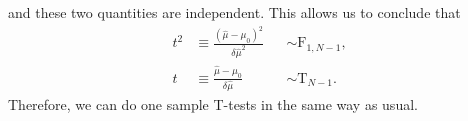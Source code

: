 \documentclass[12pt]{article}
\newcommand{\mh}{\hat\mu}
\begin{document}
%
and these two quantities are independent. This allows us to conclude that
%
\begin{equation}\label{eq:Tstats}
  \begin{aligned}
    t^2 &\equiv \frac{(\mh - \mu_0)^2}{\delta\mh^2} &&\sim \text{F}_{1,N-1}, \\
    t   &\equiv \frac{\mh - \mu_0}{\delta\mh}       &&\sim \text{T}_{N-1}.
  \end{aligned}
\end{equation}
%
Therefore, we can do one sample T-tests in the same way as usual.















\end{document}
